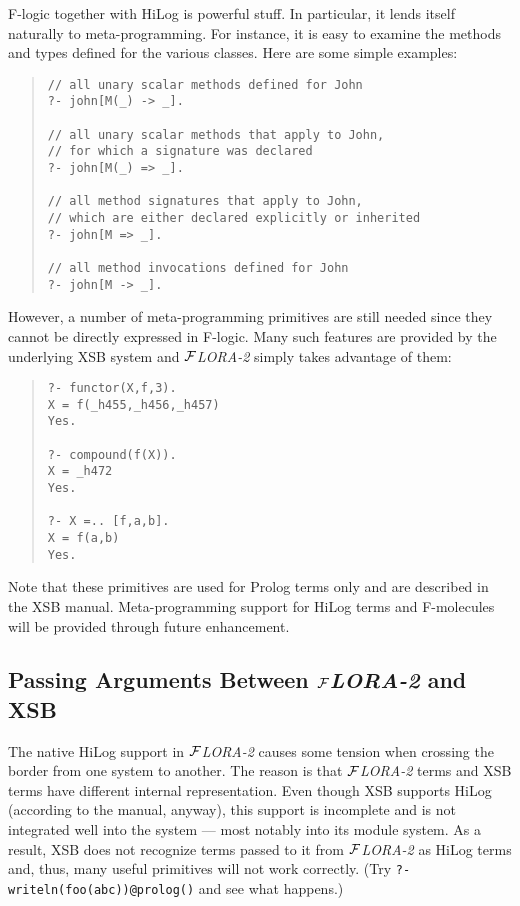 \documentclass[11pt]{article}
\newcommand{\FLORA}{{\mbox{${\cal F}${\small\it LORA}\rm\emph{-2}}}\xspace}
\newcommand{\fl}{\mbox{F-logic}\xspace}
\begin{document}
%
\fl together with HiLog is powerful stuff. In particular, it lends itself
naturally to meta-programming. For instance, it is easy to examine the
methods and types defined for the various classes.  Here are some simple
examples:
\begin{quote}
\begin{verbatim}
// all unary scalar methods defined for John
?- john[M(_) -> _].

// all unary scalar methods that apply to John,
// for which a signature was declared
?- john[M(_) => _].

// all method signatures that apply to John,
// which are either declared explicitly or inherited
?- john[M => _].

// all method invocations defined for John
?- john[M -> _].
\end{verbatim}
\end{quote}

However, a number of meta-programming primitives are still needed
since they cannot be directly expressed in \fl. Many such features are
provided by the underlying XSB system and \FLORA simply takes advantage of
them: 
\begin{quote}
\begin{verbatim}
?- functor(X,f,3).
X = f(_h455,_h456,_h457)
Yes.

?- compound(f(X)).
X = _h472
Yes.

?- X =.. [f,a,b].
X = f(a,b)
Yes.
\end{verbatim}
\end{quote}
Note that these primitives are used for Prolog terms only and
are described in the XSB manual. Meta-programming support for HiLog terms
and F-molecules will be provided through future enhancement.


\subsection{Passing Arguments Between \FLORA and XSB}

The native HiLog support in \FLORA causes some tension when crossing the
border from one system to another. The reason is that \FLORA terms and XSB
terms have different internal representation. Even though XSB supports
HiLog (according to the manual, anyway), this support is incomplete and is
not integrated well into the system --- most notably into its module
system. As a result, XSB does not recognize terms passed to it from \FLORA
as HiLog terms and, thus, many useful primitives will not work correctly.
(Try {\tt ?- writeln(foo(abc))@prolog()} and see what happens.)
\end{document}
